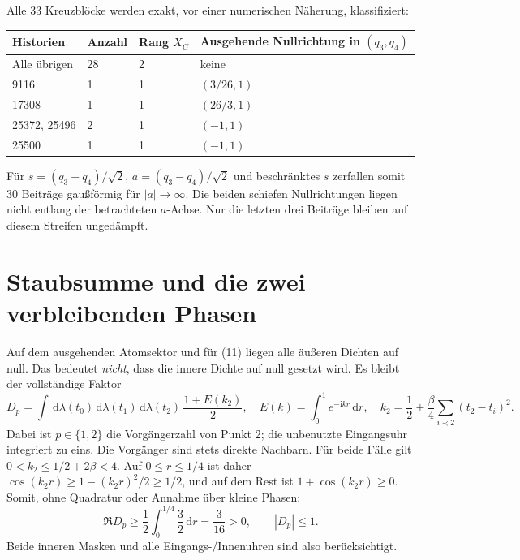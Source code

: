 \documentclass[10pt,a4paper]{article}
\newcommand{\dd}{\,\mathrm d}\newcommand{\ii}{\mathrm i}
\begin{document}
Alle 33 Kreuzblöcke werden exakt, vor einer numerischen Näherung, klassifiziert:
\begin{center}\begin{tabular}{llll}\toprule
Historien & Anzahl & Rang $X_C$ & Ausgehende Nullrichtung in $(q_3,q_4)$\\\midrule
Alle übrigen & 28 & 2 & keine\\
9116 & 1 & 1 & $(3/26,1)$\\
17308 & 1 & 1 & $(26/3,1)$\\
25372, 25496 & 2 & 1 & $(-1,1)$\\
25500 & 1 & 1 & $(-1,1)$\\\bottomrule
\end{tabular}\end{center}
Für $s=(q_3+q_4)/\sqrt2$, $a=(q_3-q_4)/\sqrt2$ und beschränktes $s$ zerfallen
somit 30 Beiträge gaußförmig für $|a|\to\infty$. Die beiden schiefen Nullrichtungen
liegen nicht entlang der betrachteten $a$-Achse. Nur die letzten drei Beiträge
bleiben auf diesem Streifen ungedämpft.

\section{Staubsumme und die zwei verbleibenden Phasen}
Auf dem ausgehenden Atomsektor und für (11) liegen alle äußeren Dichten auf null.
Das bedeutet \emph{nicht}, dass die innere Dichte auf null gesetzt wird. Es bleibt
der vollständige Faktor
\[
 D_p=\int\dd\lambda(t_0)\dd\lambda(t_1)\dd\lambda(t_2)\,
 \frac{1+E(k_2)}2,\quad
 E(k)=\int_0^1e^{-\ii kr}\dd r,
 \quad k_2=\frac12+\frac\beta4\sum_{i\prec2}(t_2-t_i)^2. \tag{14}
\]
Dabei ist $p\in\{1,2\}$ die Vorgängerzahl von Punkt 2; die unbenutzte
Eingangsuhr integriert zu eins. Die Vorgänger sind stets direkte Nachbarn.
Für beide Fälle gilt $0<k_2\le1/2+2\beta<4$. Auf $0\le r\le1/4$ ist daher
$\cos(k_2r)\ge1-(k_2r)^2/2\ge1/2$, und auf dem Rest ist $1+\cos(k_2r)\ge0$.
Somit, ohne Quadratur oder Annahme über kleine Phasen:
\[
 \Re D_p\ge\frac12\int_0^{1/4}\frac32\dd r=\frac3{16}>0,
 \qquad |D_p|\le1. \tag{15}
\]
Beide inneren Masken und alle Eingangs-/Innenuhren sind also berücksichtigt.
\end{document}
